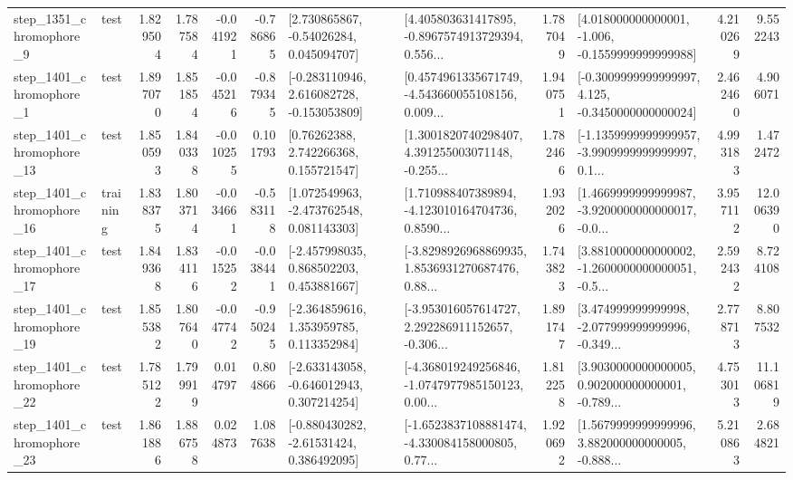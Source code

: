 \begin{tabular}{llrrrrllrlrr}
  step\_1351\_chromophore\_9 &      test &      1.829504 &    1.787584 &     -0.041921 & -0.786865 &     [2.730865867, -0.54026284, 0.045094707] &  [4.405803631417895, -0.8967574913729394, 0.556... &       1.787049 &   [4.018000000000001, -1.006, -0.1559999999999988] &            4.210269 &          9.552243 \\
  step\_1401\_chromophore\_1 &      test &      1.897070 &    1.851854 &     -0.045216 & -0.879345 &   [-0.283110946, 2.616082728, -0.153053809] &  [0.4574961335671749, -4.543660055108156, 0.009... &       1.940751 &  [-0.3009999999999997, 4.125, -0.3450000000000024] &            2.462460 &          4.906071 \\
 step\_1401\_chromophore\_13 &      test &      1.850593 &    1.840338 &     -0.010255 &  0.101793 &      [0.76262388, 2.742266368, 0.155721547] &  [1.3001820740298407, 4.391255003071148, -0.255... &       1.782466 &  [-1.1359999999999957, -3.9909999999999997, 0.1... &            4.993183 &          1.472472 \\
 step\_1401\_chromophore\_16 &  training &      1.838375 &    1.803714 &     -0.034661 & -0.583118 &    [1.072549963, -2.473762548, 0.081143303] &  [1.710988407389894, -4.123010164704736, 0.8590... &       1.932026 &  [1.4669999999999987, -3.9200000000000017, -0.0... &            3.957112 &         12.006390 \\
 step\_1401\_chromophore\_17 &      test &      1.849368 &    1.834116 &     -0.015252 & -0.038441 &    [-2.457998035, 0.868502203, 0.453881667] &  [-3.8298926968869935, 1.8536931270687476, 0.88... &       1.743823 &  [3.8810000000000002, -1.2600000000000051, -0.5... &            2.592432 &          8.724108 \\
 step\_1401\_chromophore\_19 &      test &      1.855382 &    1.807640 &     -0.047742 & -0.950245 &    [-2.364859616, 1.353959785, 0.113352984] &  [-3.953016057614727, 2.292286911152657, -0.306... &       1.891747 &  [3.474999999999998, -2.077999999999996, -0.349... &            2.778713 &          8.807532 \\
 step\_1401\_chromophore\_22 &      test &      1.785122 &    1.799919 &      0.014797 &  0.804866 &   [-2.633143058, -0.646012943, 0.307214254] &  [-4.368019249256846, -1.0747977985150123, 0.00... &       1.812258 &  [3.9030000000000005, 0.902000000000001, -0.789... &            4.753013 &         11.106819 \\
 step\_1401\_chromophore\_23 &      test &      1.861886 &    1.886758 &      0.024873 &  1.087638 &    [-0.880430282, -2.61531424, 0.386492095] &  [-1.6523837108881474, -4.330084158000805, 0.77... &       1.920692 &  [1.5679999999999996, 3.882000000000005, -0.888... &            5.210863 &          2.684821 \\

\end{tabular}
